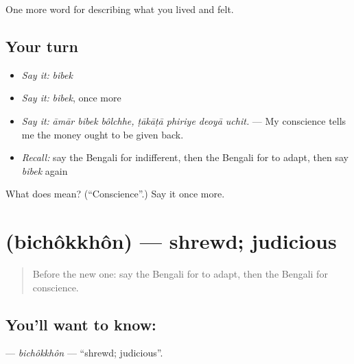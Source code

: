 \begin{grammarlens}[title={What you've built}]
One more word for describing what you lived and felt.
\end{grammarlens}

\subsection*{Your turn}
\begin{itemize}
\raggedright
  \item \emph{Say it:} \emph{bibek}
  \item \emph{Say it:} \emph{bibek}, once more
  \item \emph{Say it:} \emph{āmār bibek bôlchhe, ṭākāṭā phiriye deoyā uchit.} — My conscience tells me the money ought to be given back.
  \item \emph{Recall:} say the Bengali for indifferent, then the Bengali for to adapt, then say \emph{bibek} again
\end{itemize}

\begin{tcolorbox}[breakable,colback=teal!4,colframe=teal!35!black,title={Before you move on}]
What does  mean? (\textquotedblleft{}Conscience\textquotedblright{}.) Say it once more.
\end{tcolorbox}
\section[\texorpdfstring{\bn{বিচক্ষণ} (bichôkkhôn)}{বিচক্ষণ (bichôkkhôn)}]{ (bichôkkhôn) — shrewd; judicious}

\label{lesson:BN-C465-bichokkhon}



\begin{quote}
Before the new one: say the Bengali for to adapt, then the Bengali for conscience.
\end{quote}

\subsection*{You'll want to know: }
\textbf{} — \emph{bichôkkhôn} — \textquotedblleft{}shrewd; judicious\textquotedblright{}.

\begin{quote}
    
\end{quote}

